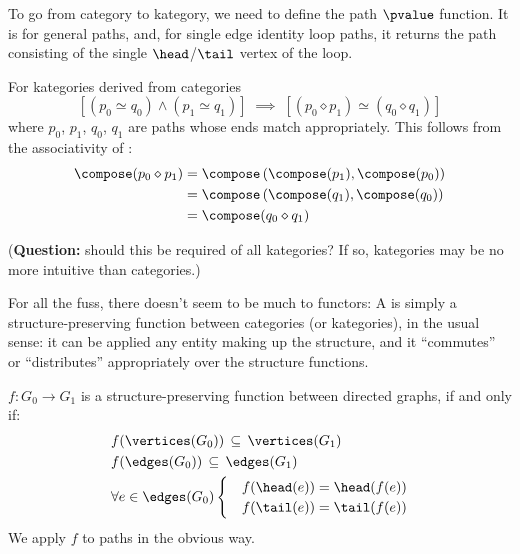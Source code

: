\documentclass[11pt,openany]{book}
\begin{document}
To go from category to kategory, we need to define the 
path $\pvalue$ function.
It is \compose for general paths, and, 
for single edge identity loop paths,
it returns the 
path consisting of the single 
$\head$/$\tail$ vertex of the loop.

For kategories derived from categories
\begin{equation*}
\left[ \left( p_0 \simeq q_0 \right) \wedge 
 \left( p_1 \simeq q_1  \right) \right]
\; \implies \; 
\left[
\left( p_0 \diamond p_1 \right)
\simeq
\left( q_0 \diamond q_1 \right)
\right]
\end{equation*}
where $p_0$, $p_1$, $q_0$, $q_1$ are paths 
whose ends match appropriately.
This follows from the associativity of \compose:
\begin{align*}
\compose(p_0 \diamond p_1) 
& = 
\compose \left( 
\compose(p_1),
\compose(p_0) \right)
\\
& = 
\compose \left( 
\compose(q_1),
\compose(q_0) \right)
\\
& = 
\compose(q_0 \diamond q_1) 
\end{align*}
 
(\textbf{Question:} should this be required of all kategories?
If so, kategories may be no more intuitive than categories.)

\label{sec:functor}

For all the fuss, there doesn't seem to be much to functors:
A  is simply a structure-preserving function
between categories (or kategories), in the usual sense:
it can be applied any entity 
making up the structure,
and it ``commutes'' or ``distributes'' appropriately
over the structure functions.

\begin{definition}
$f:G_0 \rightarrow G_1$ is a structure-preserving function
between directed graphs, if and only if:
\begin{align*}
  & f(\vertices(G_0)) \, \subseteq \, \vertices(G_1) \\
  & f(\edges(G_0)) \, \subseteq \, \edges(G_1) \\
  & \forall e \in \edges(G_0) 
  \begin{cases}
  & f(\head(e)) = \head(f(e)) \\
  & f(\tail(e)) = \tail(f(e))
  \end{cases}
\end{align*}
We apply $f$ to paths in the obvious way.
\end{definition}
\end{document}
